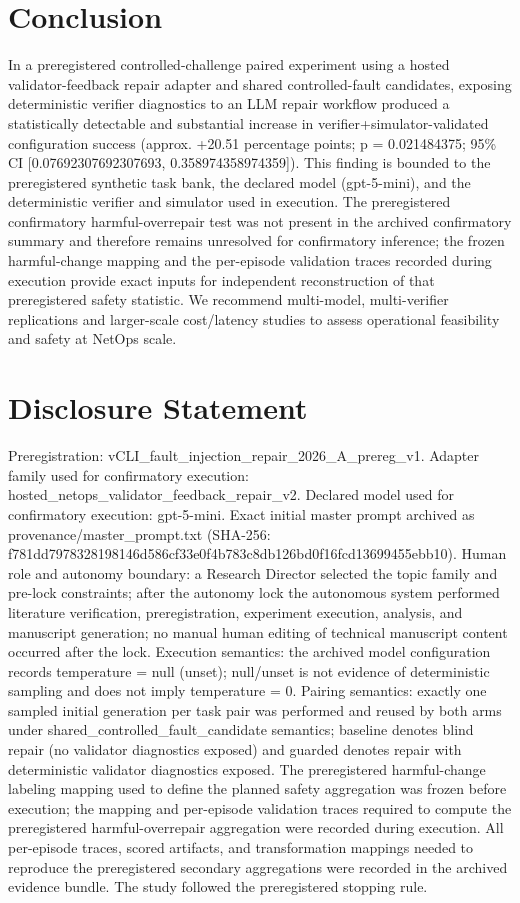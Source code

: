 \documentclass[conference]{IEEEtran}
\begin{document}
\section{Conclusion}
In a preregistered controlled-challenge paired experiment using a hosted validator-feedback repair adapter and shared controlled-fault candidates, exposing deterministic verifier diagnostics to an LLM repair workflow produced a statistically detectable and substantial increase in verifier+simulator-validated configuration success (approx. +20.51 percentage points; p = 0.021484375; 95\% CI [0.07692307692307693, 0.358974358974359]). This finding is bounded to the preregistered synthetic task bank, the declared model (gpt-5-mini), and the deterministic verifier and simulator used in execution. The preregistered confirmatory harmful-overrepair test was not present in the archived confirmatory summary and therefore remains unresolved for confirmatory inference; the frozen harmful-change mapping and the per-episode validation traces recorded during execution provide exact inputs for independent reconstruction of that preregistered safety statistic. We recommend multi-model, multi-verifier replications and larger-scale cost/latency studies to assess operational feasibility and safety at NetOps scale.

\section*{Disclosure Statement}
Preregistration: vCLI\_fault\_injection\_repair\_2026\_A\_prereg\_v1. Adapter family used for confirmatory execution: hosted\_netops\_validator\_feedback\_repair\_v2. Declared model used for confirmatory execution: gpt-5-mini. Exact initial master prompt archived as provenance/master\_prompt.txt (SHA-256: f781dd79\allowbreak{}78328198\allowbreak{}146d586c\allowbreak{}f33e0f4b\allowbreak{}783c8db1\allowbreak{}26bd0f16\allowbreak{}fcd13699\allowbreak{}455ebb10). Human role and autonomy boundary: a Research Director selected the topic family and pre-lock constraints; after the autonomy lock the autonomous system performed literature verification, preregistration, experiment execution, analysis, and manuscript generation; no manual human editing of technical manuscript content occurred after the lock. Execution semantics: the archived model configuration records temperature = null (unset); null/unset is not evidence of deterministic sampling and does not imply temperature = 0. Pairing semantics: exactly one sampled initial generation per task pair was performed and reused by both arms under shared\_controlled\_fault\_candidate semantics; baseline denotes blind repair (no validator diagnostics exposed) and guarded denotes repair with deterministic validator diagnostics exposed. The preregistered harmful-change labeling mapping used to define the planned safety aggregation was frozen before execution; the mapping and per-episode validation traces required to compute the preregistered harmful-overrepair aggregation were recorded during execution. All per-episode traces, scored artifacts, and transformation mappings needed to reproduce the preregistered secondary aggregations were recorded in the archived evidence bundle. The study followed the preregistered stopping rule.
\end{document}
